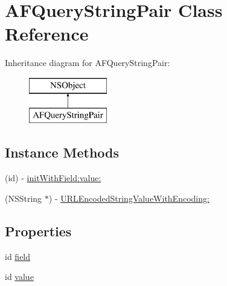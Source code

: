 \hypertarget{interface_a_f_query_string_pair}{\section{A\-F\-Query\-String\-Pair Class Reference}
\label{interface_a_f_query_string_pair}
}
Inheritance diagram for A\-F\-Query\-String\-Pair\-:\begin{figure}[H]
\begin{center}
\leavevmode
\includegraphics[height=2.000000cm]{interface_a_f_query_string_pair}
\end{center}
\end{figure}
\subsection*{Instance Methods}
\begin{DoxyCompactItemize}
\item 
(id) -\/ \hyperlink{interface_a_f_query_string_pair_a959f4cb1984075c5325c6e2e6266ae0f}{init\-With\-Field\-:value\-:}
\item 
(N\-S\-String $\ast$) -\/ \hyperlink{interface_a_f_query_string_pair_a1fb00452b65de6c63f228c52f57b583b}{U\-R\-L\-Encoded\-String\-Value\-With\-Encoding\-:}
\end{DoxyCompactItemize}
\subsection*{Properties}
\begin{DoxyCompactItemize}
\item 
id \hyperlink{interface_a_f_query_string_pair_a56a6a5052194b3fd862dc7eed618a646}{field}
\item 
id \hyperlink{interface_a_f_query_string_pair_a8aafaee91dab273d51a9448bfb4e7676}{value}
\end{DoxyCompactItemize}


